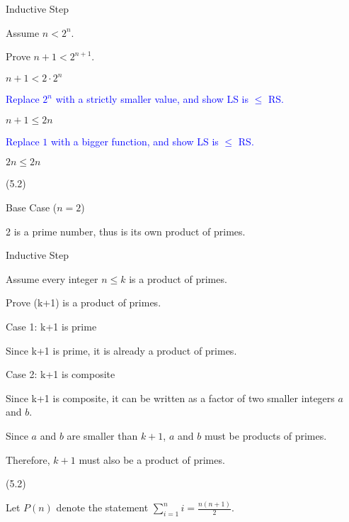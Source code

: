\documentclass{exam}
\begin{document}
\begin{questions}
\begin{center}
\vspace{5px}

Inductive Step

Assume \( n < 2^n \). 

Prove \( n+1 < 2^{n+1} \).

\( n+1 < 2 \cdot 2^n \) 

\textcolor{blue}{Replace \(2^n\) with a strictly smaller value, and show LS is \(\leq\) RS.}

\( n+1 \leq 2n \) 

\textcolor{blue}{Replace \(1\) with a bigger function, and show LS is \(\leq\) RS.}

\( 2n \leq 2n \)

\end{center}

 (5.2)

\begin{center}
Base Case (\(n = 2\))

2 is a prime number, thus is its own product of primes.

\vspace{5px}

Inductive Step

Assume every integer \( n \leq k \) is a product of primes. 

Prove (k+1) is a product of primes.

Case 1: k+1 is prime

Since k+1 is prime, it is already a product of primes.
\vspace{5px}

Case 2: k+1 is composite

Since k+1 is composite, it can be written as a factor of two smaller integers \(a\) and \(b\).

Since \(a\) and \(b\) are smaller than \(k+1\), \(a\) and \(b\) must be products of primes.

Therefore, \(k+1\) must also be a product of primes.

\end{center}

\newpage

 (5.2)

\begin{center}

Let \(P(n)\) denote the statement \( \sum_{i=1}^{n} i = \frac{n(n+1)}{2} \).


\end{center}
\end{questions}
\end{document}
